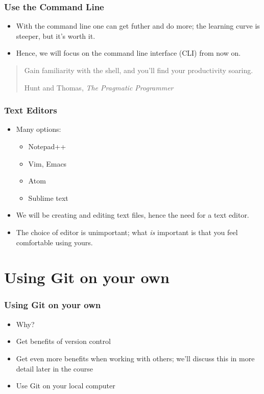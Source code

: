 \documentclass{git_course}
\begin{document}
\begin{frame}
\frametitle{Use the Command Line}
\begin{itemize}
    \item With the command line one can get futher and do more; the
        learning curve is steeper, but it's worth it.
    \item Hence, we will focus on the command line interface (CLI) from now
        on.
\end{itemize}
    \blockquote[Hunt and Thomas, \emph{The Pragmatic Programmer}]
    {Gain familiarity with the shell, and you'll find your productivity soaring.}
\end{frame}

\begin{frame}
\frametitle{Text Editors}
\begin{itemize}
    \item Many options:
    \begin{itemize}
        \item Notepad++
        \item Vim, Emacs
        \item Atom
        \item Sublime text
    \end{itemize}
    \item We will be creating and editing text files, hence the need for a
        text editor.
    \item The choice of editor is unimportant; what \emph{is} important is
        that you feel comfortable using yours.
\end{itemize}
\end{frame}

\section{Using Git on your own}

\begin{frame}
\frametitle{Using Git on your own}
\begin{itemize}
    \item Why?
    \item Get benefits of version control
    \item Get even more benefits when working with others; we'll discuss
        this in more detail later in the course
    \item Use Git on your local computer
\end{itemize}
\end{frame}
\end{document}

